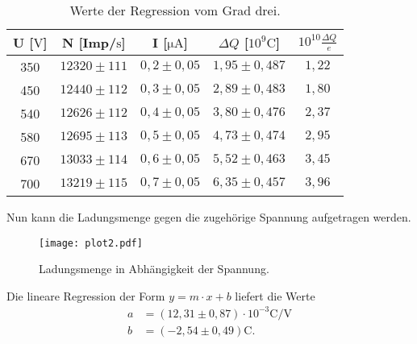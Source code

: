 \begin{table}[H]
  \caption{Werte der Regression vom Grad drei.}
  \label{tab:lad}
  \centering
  \begin{tabular}{c c c c c}
      \toprule
      U [$\si{\volt}$] & N [Imp/$\si{\second}$] & I [$\si{\micro\ampere}$] & $\Delta Q$ [$10^9 \si{\coulomb}$] & $10^{10} \frac{\Delta Q}{e}$ \\
      \midrule
      350 & $ 12320 \pm 111 $ & $ 0,2 \pm 0,05 $ & $ 1,95 \pm 0,487 $ & $ 1,22 $ \\
      450 & $ 12440 \pm 112 $ & $ 0,3 \pm 0,05 $ & $ 2,89 \pm 0,483 $ & $ 1,80 $ \\
      540 & $ 12626 \pm 112 $ & $ 0,4 \pm 0,05 $ & $ 3,80 \pm 0,476 $ & $ 2,37 $ \\
      580 & $ 12695 \pm 113 $ & $ 0,5 \pm 0,05 $ & $ 4,73 \pm 0,474 $ & $ 2,95 $ \\
      670 & $ 13033 \pm 114 $ & $ 0,6 \pm 0,05 $ & $ 5,52 \pm 0,463 $ & $ 3,45 $ \\
      700 & $ 13219 \pm 115 $ & $ 0,7 \pm 0,05 $ & $ 6,35 \pm 0,457 $ & $ 3,96 $ \\
      \bottomrule
    \end{tabular}
\end{table}

Nun kann die Ladungsmenge gegen die zugehörige Spannung aufgetragen werden.

\begin{figure}[H]
  \centering
  \texttt{[image: plot2.pdf]}
  \caption{Ladungsmenge in Abhängigkeit der Spannung.}
  \label{fig:plot}
\end{figure}

Die lineare Regression der Form $y = m \cdot x + b$ liefert die Werte
\begin{align*}
  a &= (12,31 \pm 0,87) \cdot 10^{-3} \si{\coulomb\per\volt} \\
  b &= (-2,54 \pm 0,49) \si{\coulomb}.
\end{align*}
